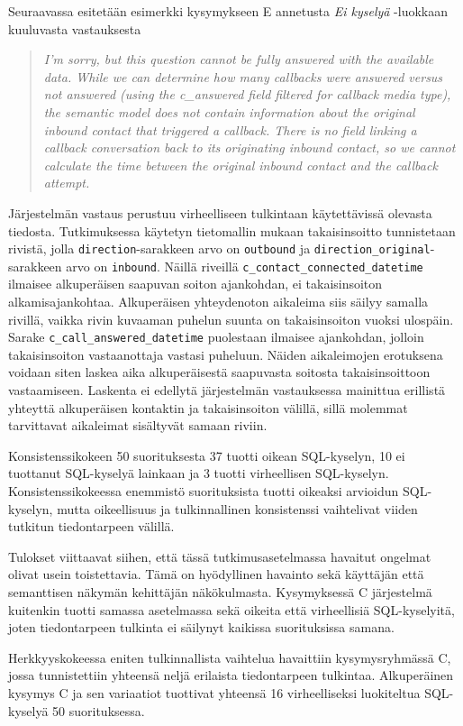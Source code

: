 Seuraavassa esitetään esimerkki kysymykseen E annetusta
\textit{Ei kyselyä} -luokkaan kuuluvasta vastauksesta
\begin{quote}\itshape
  I'm sorry, but this question cannot be fully answered with the available data. While we can determine how many callbacks were answered versus not answered (using the c\_answered field filtered for callback media type), the semantic model does not contain information about the original inbound contact that triggered a callback. There is no field linking a callback conversation back to its originating inbound contact, so we cannot calculate the time between the original inbound contact and the callback attempt.
\end{quote}
Järjestelmän vastaus perustuu virheelliseen tulkintaan käytettävissä
olevasta tiedosta. Tutkimuksessa käytetyn tietomallin mukaan
takaisinsoitto tunnistetaan rivistä, jolla \texttt{direction}-sarakkeen
arvo on \texttt{outbound} ja \texttt{direction\_original}-sarakkeen arvo
on \texttt{inbound}. Näillä riveillä
\texttt{c\_contact\_connected\_datetime} ilmaisee alkuperäisen saapuvan
soiton ajankohdan, ei takaisinsoiton alkamisajankohtaa. Alkuperäisen
yhteydenoton aikaleima siis säilyy samalla rivillä, vaikka rivin
kuvaaman puhelun suunta on takaisinsoiton vuoksi ulospäin.
Sarake \texttt{c\_call\_answered\_datetime} puolestaan ilmaisee
ajankohdan, jolloin takaisinsoiton vastaanottaja vastasi puheluun.
Näiden aikaleimojen erotuksena voidaan siten laskea aika
alkuperäisestä saapuvasta soitosta takaisinsoittoon vastaamiseen.
Laskenta ei edellytä järjestelmän vastauksessa mainittua erillistä
yhteyttä alkuperäisen kontaktin ja takaisinsoiton välillä, sillä
molemmat tarvittavat aikaleimat sisältyvät samaan riviin.

Konsistenssikokeen 50 suorituksesta 37 tuotti oikean SQL-kyselyn,
10 ei tuottanut SQL-kyselyä lainkaan ja 3 tuotti virheellisen
SQL-kyselyn. Konsistenssikokeessa enemmistö suorituksista tuotti oikeaksi arvioidun SQL-kyselyn, mutta oikeellisuus ja tulkinnallinen konsistenssi vaihtelivat viiden tutkitun tiedontarpeen välillä.

Tulokset viittaavat siihen, että tässä tutkimusasetelmassa havaitut
ongelmat olivat usein toistettavia. Tämä on hyödyllinen havainto sekä
käyttäjän että semanttisen näkymän kehittäjän näkökulmasta.
Kysymyksessä C järjestelmä kuitenkin tuotti samassa asetelmassa sekä
oikeita että virheellisiä SQL-kyselyitä, joten tiedontarpeen tulkinta
ei säilynyt kaikissa suorituksissa samana.

Herkkyyskokeessa eniten tulkinnallista vaihtelua havaittiin
kysymysryhmässä C, jossa tunnistettiin yhteensä neljä erilaista
tiedontarpeen tulkintaa. Alkuperäinen kysymys C ja sen
variaatiot tuottivat yhteensä 16 virheelliseksi luokiteltua
SQL-kyselyä 50 suorituksessa.

